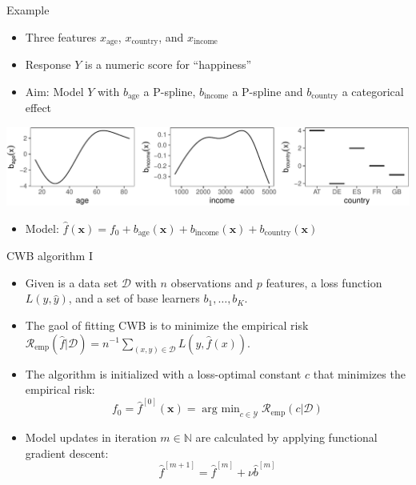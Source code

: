 \documentclass[ignorenonframetext,]{beamer}
\providecommand{\tightlist}{%
  \setlength{\itemsep}{0pt}\setlength{\parskip}{0pt}}
\newcommand{\D}{\mathcal{D}}
\newcommand{\fh}{\hat{f}}
\newcommand{\fmh}{\fh^{[m]}}
\newcommand{\blK}{K}
\newcommand{\xv}{\bm{x}}
\newcommand{\argmin}{\operatorname{arg~min}}
\newcommand{\riske}{\mathcal{R}_{\text{emp}}}
\begin{document}
\begin{frame}{Example}
\protect\hypertarget{example}{}
\begin{itemize}
\tightlist
\item
  Three features \(x_{\text{age}}\), \(x_{\text{country}}\), and
  \(x_{\text{income}}\)
\item
  Response \(Y\) is a numeric score for ``happiness''
\item
  Aim: Model \(Y\) with \(b_{\text{age}}\) a P-spline,
  \(b_{\text{income}}\) a P-spline and \(b_{\text{country}}\) a
  categorical effect
\end{itemize}

\begin{center}\includegraphics{figures/unnamed-chunk-1-1} \end{center}

\begin{itemize}
\tightlist
\item
  Model:
  \(\hat{f}(\bm{x}) = f_0 + b_{\text{age}}(\bm{x}) + b_{\text{income}}(\bm{x}) + b_{\text{country}}(\bm{x})\)
\end{itemize}
\end{frame}

\begin{frame}{CWB algorithm I}
\protect\hypertarget{cwb-algorithm-i}{}
\begin{itemize}
\tightlist
\item
  Given is a data set \(\D\) with \(n\) observations and \(p\) features,
  a loss function \(L(y, \hat{y})\), and a set of base learners
  \(b_1, \dots, b_\blK\).
\item
  The gaol of fitting CWB is to minimize the empirical risk
  \(\riske(\fh | \D) = n^{-1}\sum_{(x,y)\in\D} L(y, \fh(x))\).
\item
  The algorithm is initialized with a loss-optimal constant \(c\) that
  minimizes the empirical risk:
  \[f_0 = \fh^{[0]}(\xv) = \argmin_{c\in\mathcal{Y}}\riske(c|\D)\]
\item
  Model updates in iteration \(m\in\mathbb{N}\) are calculated by
  applying functional gradient descent:
  \[\fh^{[m+1]} = \fmh + \nu \hat{b}^{[m]}\]
\end{itemize}
\end{frame}
\end{document}
